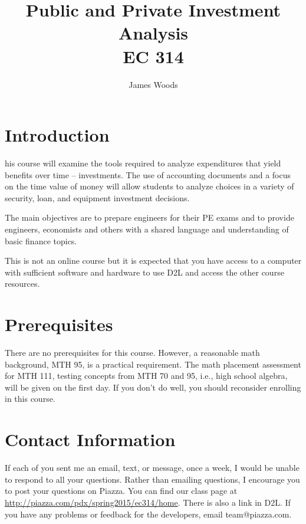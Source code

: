 \documentclass[letterpaper,10pt]{article}
\date{}
\title{Public and Private Investment Analysis\\  
EC 314\\
\Term}
\author{James Woods}
\newcommand{\Piazza}{\url{http://piazza.com/pdx/spring2015/ec314/home}}
\begin{document}
  
\maketitle

\section{Introduction}

his course will examine the tools required to analyze expenditures
that yield benefits over time -- investments. The use of accounting
documents and a focus on the time value of money will allow students
to analyze choices in a variety of security, loan, and equipment
investment decisions.

The main objectives are to prepare engineers for their PE exams and to
provide engineers, economists and others with a shared language and
understanding of basic finance topics.



This is not an online course but it is expected that you have access to a
computer with sufficient software and hardware to use D2L and access the other course resources.

% 

\section{Prerequisites}

There are no prerequisites for this course. However, a reasonable math
background, MTH 95, is a practical requirement. 
 The math placement assessment for MTH 111, testing concepts from MTH 70 and 95, i.e., high school algebra, will be given on the first day.  If you don't do well, you should reconsider enrolling in this course.

\section{Contact Information}

If each of you sent me an email, text, or message, once a week, I would be unable to respond to all your questions.  Rather than emailing questions, I encourage you to post your questions on Piazza. You can find our class page at \Piazza.  There is also a link in D2L. If you have any problems or feedback for the developers, email team@piazza.com.
\end{document}
